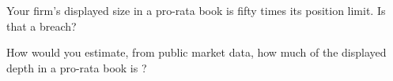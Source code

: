 \begin{interviewq}\label{iq:hf:futures-market-making:5}
Your firm's displayed size in a pro-rata book is fifty times its position limit. Is that a breach?
\end{interviewq}

\begin{interviewq}\label{iq:hf:futures-market-making:6}
How would you estimate, from public market data, how much of the displayed depth in a pro-rata book is ?
\end{interviewq}
